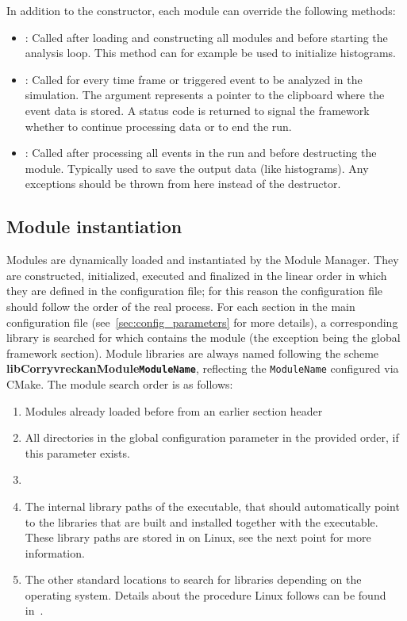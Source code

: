 In addition to the constructor, each module can override the following methods:
\begin{itemize}
\item {}: Called after loading and constructing all modules and before starting the analysis loop.
This method can for example be used to initialize histograms.
\item {}: Called for every time frame or triggered event to be analyzed in the simulation. The argument represents a pointer to the clipboard where the event data is stored.
A status code is returned to signal the framework whether to continue processing data or to end the run.
\item {}: Called after processing all events in the run and before destructing the module.
Typically used to save the output data (like histograms).
Any exceptions should be thrown from here instead of the destructor.
\end{itemize}

\subsection{Module instantiation}
\label{sec:module_instantiation}
Modules are dynamically loaded and instantiated by the Module Manager.
They are constructed, initialized, executed and finalized in the linear order in which they are defined in the configuration file; for this reason the configuration file should follow the order of the real process.
For each section in the main configuration file (see~\ref{sec:config_parameters} for more details), a corresponding library is searched for which contains the module (the exception being the global framework section).
Module libraries are always named following the scheme \textbf{libCorryvreckanModule\texttt{ModuleName}}, reflecting the \texttt{ModuleName} configured via CMake.
The module search order is as follows:
\begin{enumerate}
\item Modules already loaded before from an earlier section header
\item All directories in the global configuration parameter  in the provided order, if this parameter exists.
\item \item The internal library paths of the executable, that should automatically point to the libraries that are built and installed together with the executable.
These library paths are stored in  on Linux, see the next point for more information.
\item The other standard locations to search for libraries depending on the operating system.
Details about the procedure Linux follows can be found in~\cite{linuxld}.
\end{enumerate}

